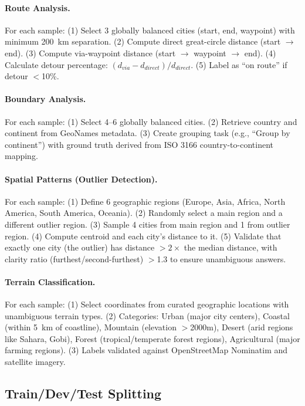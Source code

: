 \paragraph{Route Analysis.}
For each sample: (1) Select 3 globally balanced cities (start, end, waypoint) with minimum 200~km separation. (2) Compute direct great-circle distance (start $\rightarrow$ end). (3) Compute via-waypoint distance (start $\rightarrow$ waypoint $\rightarrow$ end). (4) Calculate detour percentage: $(d_{via} - d_{direct}) / d_{direct}$. (5) Label as ``on route'' if detour $<$10\%.

\paragraph{Boundary Analysis.}
For each sample: (1) Select 4--6 globally balanced cities. (2) Retrieve country and continent from GeoNames metadata. (3) Create grouping task (e.g., ``Group by continent'') with ground truth derived from ISO 3166 country-to-continent mapping.

\paragraph{Spatial Patterns (Outlier Detection).}
For each sample: (1) Define 6 geographic regions (Europe, Asia, Africa, North America, South America, Oceania). (2) Randomly select a main region and a different outlier region. (3) Sample 4 cities from main region and 1 from outlier region. (4) Compute centroid and each city's distance to it. (5) Validate that exactly one city (the outlier) has distance $>2\times$ the median distance, with clarity ratio (furthest/second-furthest) $>$1.3 to ensure unambiguous answers.

\paragraph{Terrain Classification.}
For each sample: (1) Select coordinates from curated geographic locations with unambiguous terrain types. (2) Categories: Urban (major city centers), Coastal (within 5~km of coastline), Mountain (elevation $>$2000m), Desert (arid regions like Sahara, Gobi), Forest (tropical/temperate forest regions), Agricultural (major farming regions). (3) Labels validated against OpenStreetMap Nominatim and satellite imagery.

\subsection{Train/Dev/Test Splitting}

